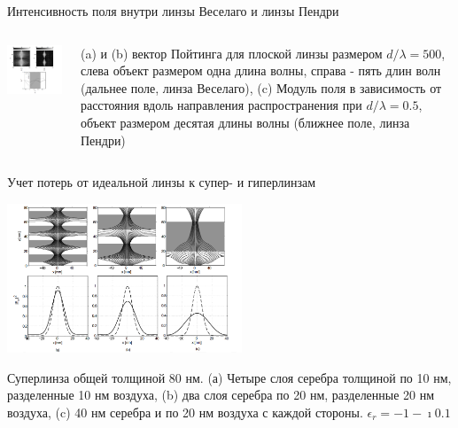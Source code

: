 \documentclass[9pt, compress, xcolor=table]{beamer}
\begin{document}
\begin{frame}{Интенсивность поля внутри линзы Веселаго и линзы Пендри}

\begin{columns}[c]

\column{8cm}
\begin{center}
\includegraphics[width=8cm]{neg_ref_40d}
\end{center}

\column{4cm}  (a) и (b) вектор Пойтинга для плоской линзы размером $d/\lambda = 500$, слева
объект размером одна длина волны, справа - пять длин волн (дальнее поле, линза Веселаго), (c)
Модуль поля в зависимость от расстояния вдоль направления распространения при $d/\lambda = 0.5$,
объект размером десятая длины волны (ближнее поле, линза Пендри)
\end{columns}
\end{frame}


\begin{frame}{Учет потерь от идеальной линзы к супер- и гиперлинзам}
\begin{center}
\includegraphics[width=7cm]{neg_ref_40f}
\end{center}

 Суперлинза общей толщиной $80$ нм. (а) Четыре слоя серебра толщиной по 10 нм,
разделенные 10 нм воздуха, (b) два слоя серебра по 20 нм, разделенные 20 нм воздуха, (c) 40 нм
серебра и по 20 нм воздуха с каждой стороны. $\epsilon_r = -1-\imath 0.1$
\end{frame}
\end{document}
